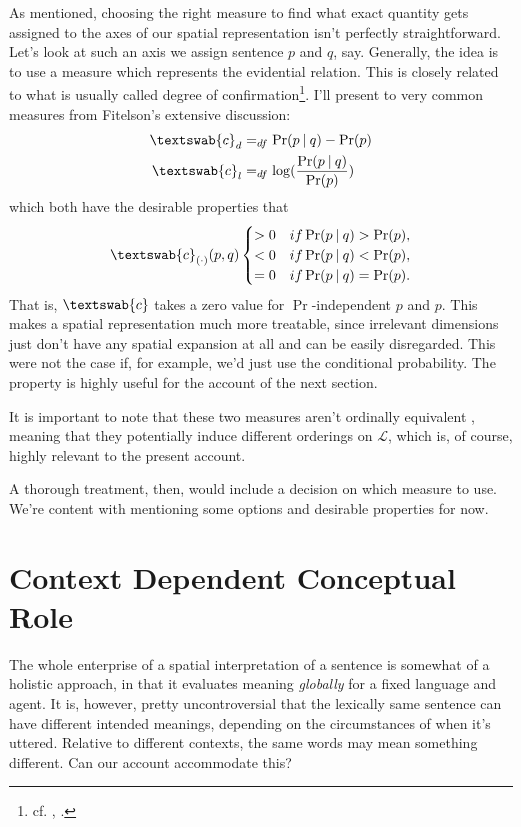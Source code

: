 \documentclass[11pt, a4paper]{scrartcl}
\renewcommand{\i}[1]{\emph{#1}}
\renewcommand{\L}{\mathcal{L}}
\newcommand{\m}[1]{\textswab{#1}}
\newcommand{\given}[1][]{\:#1\vert\:}
\begin{document}
As mentioned, choosing the right measure to find what exact quantity gets assigned to the axes of our spatial representation isn't perfectly straightforward. Let's look at such an axis we assign sentence $p$ and $q$, say. Generally, the idea is to use a measure which represents the evidential relation. This is closely related to what is usually called degree of confirmation\footnote{cf. \textcite{Fitelson1999-FITTPO-3}, \textcite{Broessel2013}.}. I'll present to very common measures from Fitelson's extensive discussion: 
\begin{align*}
    \m{c}_d &=_{df} \Pr(p\given q) - \Pr(p)\\
    \m{c}_l &=_{df} \log(\frac{\Pr(p\given q)}{\Pr(p)})
\end{align*}
which both have the desirable properties that
\[
\m{c}_{(\cdot)}(p, q) 
    \begin{cases} 
        > 0 & if \Pr(p \given q) > \Pr(p),\\
        < 0 & if \Pr(p \given q) < \Pr(p),\\
        = 0 & if \Pr(p \given q) = \Pr(p).
    \end{cases}
\]
That is, $\m{c}$ takes a zero value for $\Pr$-independent $p$ and $p$. This makes a spatial representation much more treatable, since irrelevant dimensions just don't have any spatial expansion at all and can be easily disregarded. This were not the case if, for example, we'd just use the conditional probability. The property is highly useful for the account of the next section. 

It is important to note that these two measures aren't ordinally equivalent \parencite[364]{Fitelson1999-FITTPO-3}, meaning that they potentially induce different orderings on $\L$, which is, of course, highly relevant to the present account.

A thorough treatment, then, would include a decision on which measure to use. We're content with mentioning some options and desirable properties for now. 

\section{Context Dependent Conceptual Role}

The whole enterprise of a spatial interpretation of a sentence is somewhat of a holistic approach, in that it evaluates meaning \i{globally} for a fixed language and agent. It is, however, pretty uncontroversial that the lexically same sentence can have different intended meanings, depending on the circumstances of when it's uttered. Relative to different contexts, the same words may mean something different. Can our account accommodate this? 
\end{document}
